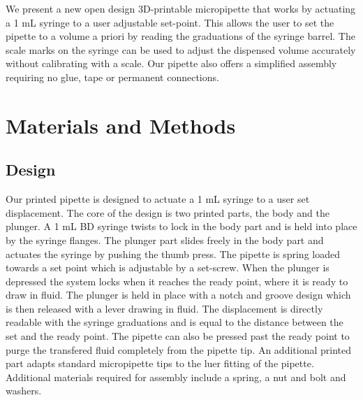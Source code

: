 \documentclass[10pt,letterpaper]{article}
\begin{document}
We present a new open design 3D-printable micropipette that works by actuating a 1 mL syringe to a user adjustable set-point.
This allows the user to set the pipette to a volume a priori by reading the graduations of the syringe barrel.
The scale marks on the syringe can be used to adjust the dispensed volume accurately without calibrating with a scale.
Our pipette also offers a simplified assembly requiring no glue, tape or permanent connections. 





\section*{Materials and Methods}
\subsection*{Design}

Our printed pipette is designed to actuate a 1 mL syringe to a user set displacement.
The core of the design is two printed parts, the body and the plunger.
A 1 mL BD syringe twists to lock in the body part and is held into place by the syringe flanges.
The plunger part slides freely in the body part and actuates the syringe by pushing the thumb press. 
The pipette is spring loaded towards a set point which is adjustable by a set-screw. 
When the plunger is depressed the system locks when it reaches the ready point, where it is ready to draw in fluid.
The plunger is held in place with a notch and groove design which is then released with a lever drawing in fluid.
The displacement is directly readable with the syringe graduations and is equal to the distance between the set and the ready point.
The pipette can also be pressed past the ready point to purge the transfered fluid completely from the pipette tip.   
An additional printed part adapts standard micropipette tips to the luer fitting of the pipette.
Additional materials required for assembly include a spring, a nut and bolt and washers.
\end{document}
